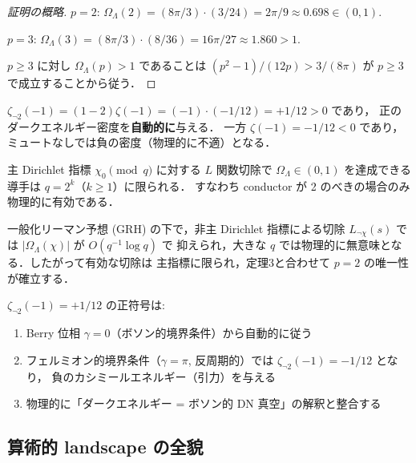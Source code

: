 \begin{proof}[証明の概略]
$p=2$: $\Omega_\Lambda(2) = (8\pi/3)\cdot(3/24) = 2\pi/9 \approx 0.698 \in (0,1)$. \checkmark

$p=3$: $\Omega_\Lambda(3) = (8\pi/3)\cdot(8/36) = 16\pi/27 \approx 1.860 > 1$. \texttimes

$p \geq 3$ に対し $\Omega_\Lambda(p) > 1$ であることは
$(p^2-1)/(12p) > 3/(8\pi)$ が $p \geq 3$ で成立することから従う．
\end{proof}

\begin{theorem}
$\zeta_{\neg 2}(-1) = (1-2)\zeta(-1) = (-1)\cdot(-1/12) = +1/12 > 0$ であり，
正のダークエネルギー密度を\textbf{自動的に}与える．
一方 $\zeta(-1) = -1/12 < 0$ であり，ミュートなしでは負の密度（物理的に不適）となる．
\end{theorem}

\begin{theorem}
主 Dirichlet 指標 $\chi_0 \pmod{q}$ に対する $L$ 関数切除で
$\Omega_\Lambda \in (0,1)$ を達成できる導手は $q = 2^k$（$k \geq 1$）に限られる．
すなわち conductor が 2 のべきの場合のみ物理的に有効である．
\end{theorem}

\begin{theorem}
一般化リーマン予想 (GRH) の下で，非主 Dirichlet 指標による切除
$L_{\neg\chi}(s)$ では $|\Omega_\Lambda(\chi)|$ が $O(q^{-1}\log q)$ で
抑えられ，大きな $q$ では物理的に無意味となる．したがって有効な切除は
主指標に限られ，定理3と合わせて $p=2$ の唯一性が確立する．
\end{theorem}

\begin{theorem}[符号解消の自動性]
$\zeta_{\neg 2}(-1) = +1/12$ の正符号は:
\begin{enumerate}
\item Berry 位相 $\gamma = 0$（ボソン的境界条件）から自動的に従う
\item フェルミオン的境界条件（$\gamma = \pi$, 反周期的）では $\zeta_{\neg 2}(-1) = -1/12$ となり，
  負のカシミールエネルギー（引力）を与える
\item 物理的に「ダークエネルギー = ボソン的 DN 真空」の解釈と整合する
\end{enumerate}
\end{theorem}

\subsection{算術的 landscape の全貌}

